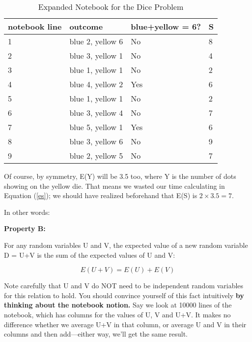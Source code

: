 \begin{table}
\begin{center}
\vskip 0.5in

\begin{tabular}{|l|l|l|l|}
\hline
notebook line & outcome & blue+yellow = 6? & S \\ \hline 
\hline
1 & blue 2, yellow 6 & No & 8 \\ \hline 
2 & blue 3, yellow 1 & No & 4 \\ \hline 
3 & blue 1, yellow 1 & No & 2 \\ \hline 
4 & blue 4, yellow 2 & Yes & 6 \\ \hline 
5 & blue 1, yellow 1 & No & 2 \\ \hline 
6 & blue 3, yellow 4 & No & 7 \\ \hline 
7 & blue 5, yellow 1 & Yes & 6 \\ \hline 
8 & blue 3, yellow 6 & No & 9 \\ \hline 
9 & blue 2, yellow 5 & No & 7 \\ \hline 
\end{tabular}

\end{center}
\caption{Expanded Notebook for the Dice Problem}
\label{dicenotebook2} 
\end{table}

Of course, by symmetry, E(Y) will be 3.5 too, where Y is the number of
dots showing on the yellow die.  That means we wasted our time
calculating in Equation (\ref{es}); we should have realized beforehand
that E(S) is $2 \times 3.5 = 7$. 

In other words: 

{\bf Property B:} 

For any random variables U and V, the expected value of a new random
variable D = U+V is the sum of the expected values of U and V:

\begin{equation}
\label{eofsum} 
E(U+V) = E(U) + E(V)
\end{equation}

Note carefully that U and V do NOT need to be independent random
variables for this relation to hold.  You should convince yourself of
this fact intuitively {\bf by thinking about the notebook notion.}
Say we look at 10000 lines of the notebook, which has columns for the
values of U, V and U+V.  It makes no difference whether we average U+V
in that column, or average U and V in their columns and then
add---either way, we'll get the same result.

